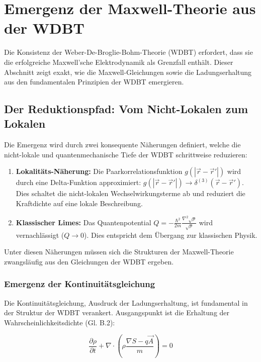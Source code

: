 \chapter{Emergenz der Maxwell-Theorie aus der WDBT}
\label{sec:emergence-maxwell}

Die Konsistenz der Weber-De-Broglie-Bohm-Theorie (WDBT) erfordert, dass sie die erfolgreiche Maxwell'sche Elektrodynamik als Grenzfall enthält. Dieser Abschnitt zeigt exakt, wie die Maxwell-Gleichungen sowie die Ladungserhaltung aus den fundamentalen Prinzipien der WDBT emergieren.

\section{Der Reduktionspfad: Vom Nicht-Lokalen zum Lokalen}

Die Emergenz wird durch zwei konsequente Näherungen definiert, welche die nicht-lokale und quantenmechanische Tiefe der WDBT schrittweise reduzieren:

\begin{enumerate}
    \item \textbf{Lokalitäts-Näherung:} Die Paarkorrelationsfunktion $g(|\vec{r} - \vec{r}'|)$ wird durch eine Delta-Funktion approximiert: $g(|\vec{r} - \vec{r}'|) \rightarrow \delta^{(3)}(\vec{r} - \vec{r}')$. Dies schaltet die nicht-lokalen Wechselwirkungsterme ab und reduziert die Kraftdichte auf eine lokale Beschreibung.
    \item \textbf{Klassischer Limes:} Das Quantenpotential $Q = -\frac{\hbar^2}{2m} \frac{\nabla^2 \sqrt{\rho}}{\sqrt{\rho}}$ wird vernachlässigt ($Q \rightarrow 0$). Dies entspricht dem Übergang zur klassischen Physik.
\end{enumerate}

Unter diesen Näherungen müssen sich die Strukturen der Maxwell-Theorie zwangsläufig aus den Gleichungen der WDBT ergeben.

\subsection{Emergenz der Kontinuitätsgleichung}

Die Kontinuitätsgleichung, Ausdruck der Ladungserhaltung, ist fundamental in der Struktur der WDBT verankert. Ausgangspunkt ist die Erhaltung der Wahrscheinlichkeitsdichte (Gl. B.2):

\begin{equation}
    \frac{\partial \rho}{\partial t} + \nabla \cdot \left( \rho \frac{\nabla S - q\vec{A}}{m} \right) = 0
\end{equation}

